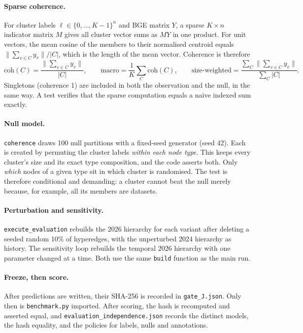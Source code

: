 \documentclass[11pt,a4paper]{article}
\theoremstyle{remark}
\newcommand{\code}[1]{\texttt{\small #1}}
\begin{document}
\paragraph{Sparse coherence.}
For cluster labels $\ell\in\{0,\dots,K-1\}^n$ and BGE matrix $Y$, a sparse $K\times n$
indicator matrix $M$ gives all cluster vector sums as $MY$ in one product. For unit vectors,
the mean cosine of the members to their normalised centroid equals $\|\sum_{v\in C}y_v\|/|C|$,
which is the length of the mean vector. Coherence is therefore
\[
\mathrm{coh}(C)=\frac{\big\|\sum_{v\in C}y_v\big\|}{|C|},\qquad
\text{macro}=\frac1K\sum_C\mathrm{coh}(C),\qquad
\text{size-weighted}=\frac{\sum_C\|\sum_{v\in C}y_v\|}{\sum_C|C|}.
\]
Singletons (coherence 1) are included in both the observation and the null, in the same way.
A test verifies that the sparse computation equals a naive indexed sum exactly.

\paragraph{Null model.}
\code{coherence} draws 100 null partitions with a fixed-seed generator (seed 42). Each is
created by permuting the cluster labels \emph{within each node type}. This keeps every
cluster's size and its exact type composition, and the code asserts both. Only
\emph{which} nodes of a given type sit in which cluster is randomised. The test is therefore
conditional and demanding: a cluster cannot beat the null merely because, for example, all
its members are datasets.

\paragraph{Perturbation and sensitivity.}
\code{execute\_evaluation} rebuilds the 2026 hierarchy for each variant after deleting a
seeded random 10\% of hyperedges, with the unperturbed 2024 hierarchy as history. The
sensitivity loop rebuilds the temporal 2026 hierarchy with one parameter changed at a time.
Both use the same \code{build} function as the main run.

\paragraph{Freeze, then score.}
After predictions are written, their SHA-256 is recorded in \code{gate\_J.json}. Only then
is \code{benchmark.py} imported. After scoring, the hash is recomputed and asserted equal,
and \code{evaluation\_independence.json} records the distinct models, the hash equality,
and the policies for labels, nulls and annotations.
\end{document}
